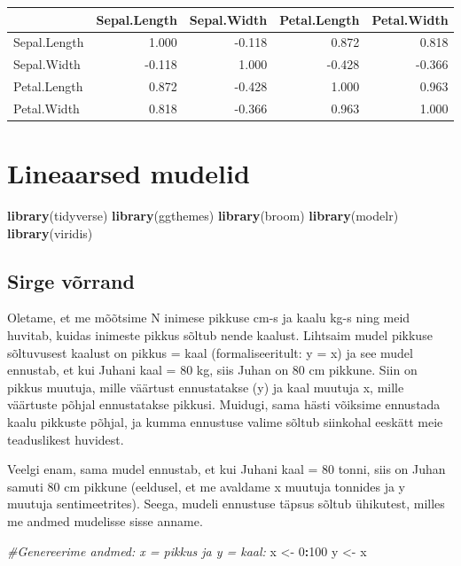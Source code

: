 \documentclass[]{book}
\newenvironment{Shaded}{\begin{snugshade}}{\end{snugshade}}
\newcommand{\KeywordTok}[1]{\textcolor[rgb]{0.13,0.29,0.53}{\textbf{#1}}}
\newcommand{\DecValTok}[1]{\textcolor[rgb]{0.00,0.00,0.81}{#1}}
\newcommand{\StringTok}[1]{\textcolor[rgb]{0.31,0.60,0.02}{#1}}
\newcommand{\CommentTok}[1]{\textcolor[rgb]{0.56,0.35,0.01}{\textit{#1}}}
\newcommand{\OperatorTok}[1]{\textcolor[rgb]{0.81,0.36,0.00}{\textbf{#1}}}
\newcommand{\NormalTok}[1]{#1}
\begin{document}
\begin{tabular}{l|r|r|r|r}
\hline
  & Sepal.Length & Sepal.Width & Petal.Length & Petal.Width\\
\hline
Sepal.Length & 1.000 & -0.118 & 0.872 & 0.818\\
\hline
Sepal.Width & -0.118 & 1.000 & -0.428 & -0.366\\
\hline
Petal.Length & 0.872 & -0.428 & 1.000 & 0.963\\
\hline
Petal.Width & 0.818 & -0.366 & 0.963 & 1.000\\
\hline
\end{tabular}

\chapter{Lineaarsed mudelid}\label{lineaarsed-mudelid}

\begin{Shaded}
\begin{Highlighting}[]
\KeywordTok{library}\NormalTok{(tidyverse)}
\KeywordTok{library}\NormalTok{(ggthemes)}
\KeywordTok{library}\NormalTok{(broom)}
\KeywordTok{library}\NormalTok{(modelr)}
\KeywordTok{library}\NormalTok{(viridis)}
\end{Highlighting}
\end{Shaded}

\section{Sirge võrrand}\label{sirge-vorrand}

Oletame, et me mõõtsime N inimese pikkuse cm-s ja kaalu kg-s ning meid
huvitab, kuidas inimeste pikkus sõltub nende kaalust. Lihtsaim mudel
pikkuse sõltuvusest kaalust on pikkus = kaal (formaliseeritult: y = x)
ja see mudel ennustab, et kui Juhani kaal = 80 kg, siis Juhan on 80 cm
pikkune. Siin on pikkus muutuja, mille väärtust ennustatakse (y) ja kaal
muutuja x, mille väärtuste põhjal ennustatakse pikkusi. Muidugi, sama
hästi võiksime ennustada kaalu pikkuste põhjal, ja kumma ennustuse
valime sõltub siinkohal eeskätt meie teaduslikest huvidest.

Veelgi enam, sama mudel ennustab, et kui Juhani kaal = 80 tonni, siis on
Juhan samuti 80 cm pikkune (eeldusel, et me avaldame x muutuja tonnides
ja y muutuja sentimeetrites). Seega, mudeli ennustuse täpsus sõltub
ühikutest, milles me andmed mudelisse sisse anname.

\begin{Shaded}
\begin{Highlighting}[]
\CommentTok{#Genereerime andmed: x = pikkus ja y = kaal:}
\NormalTok{x <-}\StringTok{ }\DecValTok{0}\OperatorTok{:}\DecValTok{100}
\NormalTok{y <-}\StringTok{ }\NormalTok{x}
\end{Highlighting}
\end{Shaded}
\end{document}
